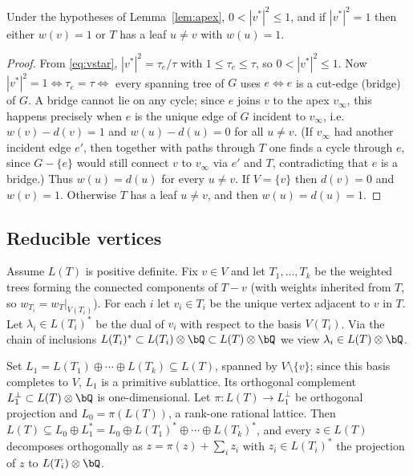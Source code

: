 \begin{cor}\label{cor:tight}
Under the hypotheses of Lemma~\ref{lem:apex}, $0<|v^{*}|^2\leq1$, and if
$|v^{*}|^2=1$ then either $w(v)=1$ or $T$ has a leaf $u\neq v$ with $w(u)=1$.
\end{cor}

\begin{proof}
From \eqref{eq:vstar}, $|v^{*}|^2=\tau_e/\tau$ with $1\le\tau_e\le\tau$, so
$0<|v^{*}|^2\leq1$. Now $|v^{*}|^2=1\iff\tau_e=\tau\iff$ every spanning tree of
$G$ uses $e\iff e$ is a cut-edge (bridge) of $G$. A bridge cannot lie on any
cycle; since $e$ joins $v$ to the apex $v_\infty$, this happens precisely when
$e$ is the unique edge of $G$ incident to $v_\infty$, i.e.\ $w(v)-d(v)=1$ and
$w(u)-d(u)=0$ for all $u\neq v$. (If $v_\infty$ had another incident edge $e'$,
then together with paths through $T$ one finds a cycle through $e$, since
$G-\{e\}$ would still connect $v$ to $v_\infty$ via $e'$ and $T$, contradicting
that $e$ is a bridge.) Thus $w(u)=d(u)$ for every $u\neq v$. If $V=\{v\}$ then
$d(v)=0$ and $w(v)=1$. Otherwise $T$ has a leaf $u\neq v$, and then
$w(u)=d(u)=1$.
\end{proof}

\subsection*{Reducible vertices}


Assume $L(T)$ is positive definite. Fix $v\in V$ and let $T_1,\dots,T_k$ be the
weighted trees forming the connected components of $T-v$ (with weights inherited
from $T$, so $w_{T_i}=w_T|_{V(T_i)}$). For each $i$ let $v_i\in T_i$ be the
unique vertex adjacent to $v$ in $T$. Let $\lambda_i\in L(T_i)^{*}$ be the dual
of $v_i$ with respect to the basis $V(T_i)$. Via the chain of inclusions
$L(T_i)^{*}\subset L(T_i)\otimes\bQ\subset L(T)\otimes\bQ$ we view $\lambda_i\in
L(T)\otimes\bQ$.

Set $L_1=L(T_1)\oplus\cdots\oplus L(T_k)\subseteq L(T)$, spanned by
$V\setminus\{v\}$; since this basis completes to $V$, $L_1$ is a primitive
sublattice. Its orthogonal complement $L_1^{\perp}\subset L(T)\otimes\bQ$ is
one-dimensional. Let $\pi:L(T)\to L_1^{\perp}$ be orthogonal projection and
$L_0=\pi(L(T))$, a rank-one rational lattice. Then
$L(T)\subseteq L_0\oplus L_1^{*}=L_0\oplus L(T_1)^{*}\oplus\cdots\oplus
L(T_k)^{*}$, and every $z\in L(T)$ decomposes orthogonally as
$z=\pi(z)+\sum_i z_i$ with $z_i\in L(T_i)^{*}$ the projection of $z$ to
$L(T_i)\otimes\bQ$.

